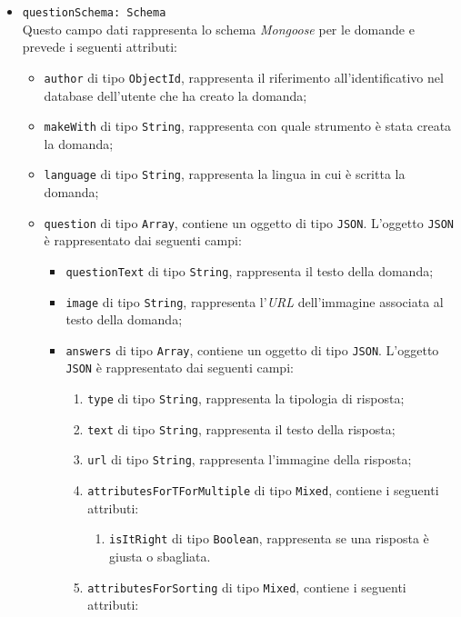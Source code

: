 \begin{itemize}
\begin{itemize}
		\item \texttt{questionSchema: Schema} \\
		Questo campo dati rappresenta lo schema \textit{Mongoose} per le domande e prevede i seguenti attributi:
		\begin{itemize}
			\item \texttt{author} di tipo \texttt{ObjectId}, rappresenta il riferimento all'identificativo nel database dell'utente che ha creato la domanda;
			\item \texttt{makeWith} di tipo \texttt{String}, rappresenta con quale strumento è stata creata la domanda;
			\item \texttt{language} di tipo \texttt{String}, rappresenta la lingua in cui è scritta la domanda; 
			\item \texttt{question} di tipo \texttt{Array}, contiene un oggetto di tipo \texttt{JSON}. L'oggetto \texttt{JSON} è rappresentato dai seguenti campi:
				\begin{itemize}
					\item \texttt{questionText} di tipo \texttt{String}, rappresenta il testo della domanda; 
					\item \texttt{image} di tipo \texttt{String}, rappresenta l'\textit{URL} dell'immagine associata al testo della domanda; 
					\item \texttt{answers} di tipo \texttt{Array}, contiene un oggetto di tipo \texttt{JSON}. L'oggetto \texttt{JSON} è rappresentato dai seguenti campi:
					\begin{enumerate}	
						\item \texttt{type} di tipo \texttt{String}, rappresenta la tipologia di risposta; 				  
						\item \texttt{text} di tipo \texttt{String}, rappresenta il testo della risposta;
        					\item \texttt{url} di tipo \texttt{String}, rappresenta l'immagine della risposta;
        					\item \texttt{attributesForTForMultiple} di tipo \texttt{Mixed}, contiene i seguenti attributi:
        					\begin{enumerate}
        						\item \texttt{isItRight} di tipo \texttt{Boolean}, rappresenta se una risposta è giusta o sbagliata.
						\end{enumerate}      
						\item \texttt{attributesForSorting} di tipo \texttt{Mixed}, contiene i seguenti attributi:
        					\begin{enumerate}

\end{enumerate}
\end{enumerate}
\end{itemize}
\end{itemize}
\end{itemize}
\end{itemize}

